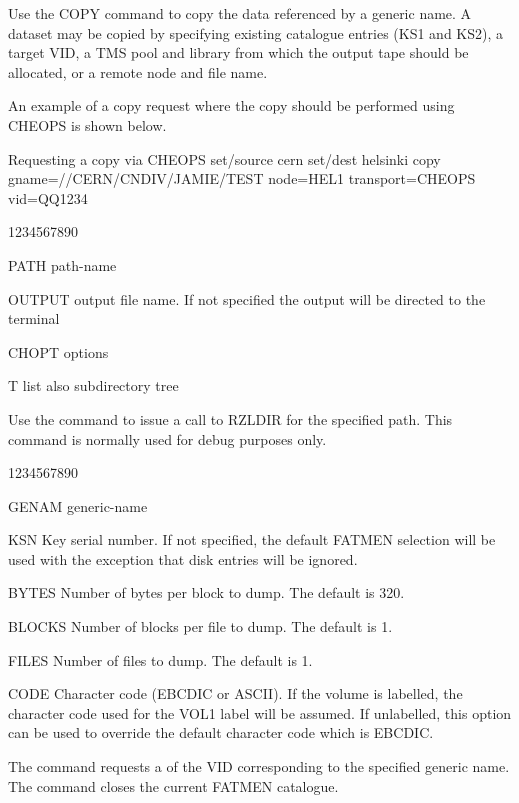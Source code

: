 Use the COPY command to copy the data referenced by a generic name.
A dataset may be copied by specifying existing catalogue entries
(KS1 and KS2), a target VID, a TMS pool and library from which
the output tape should be allocated, or a remote node and file name.

An example of a copy request where the copy should be performed
using CHEOPS  is shown below.
\begin{XMPt}{Requesting a copy via CHEOPS}
set/source cern
set/dest helsinki
copy gname=//CERN/CNDIV/JAMIE/TEST node=HEL1 transport=CHEOPS vid=QQ1234
\end{XMPt}
\begin{DLtt}{1234567890}
\item[PATH]path-name
\item[OUTPUT]output file name. If not specified the output will be 
directed to the terminal
\item[CHOPT]options
\begin{DLtt}{12}
\item[T]list also subdirectory tree
\end{DLtt}
\end{DLtt}
Use the  command to issue a call to RZLDIR for the specified
path. This command is normally used for debug purposes only.
\begin{DLtt}{1234567890}
\item[GENAM]generic-name
\item[KSN]Key serial number. If not specified, the default FATMEN
selection will be used with the exception that disk entries will 
be ignored.
\item[BYTES]Number of bytes per block to dump. The default is 320.
\item[BLOCKS]Number of blocks per file to dump. The default is 1.
\item[FILES]Number of files to dump. The default is 1.
\item[CODE]Character code (EBCDIC or ASCII). If the volume is 
labelled, the character code used for the VOL1 label will
be assumed. If unlabelled, this option can be used to override
the default character code which is EBCDIC.
\end{DLtt}
The  command requests a  of the VID
corresponding to the specified generic name.
The  command closes the current FATMEN catalogue.
